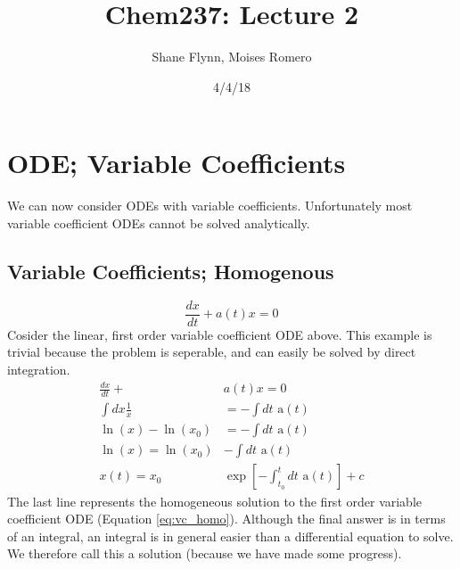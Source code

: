 \documentclass{article}
\title{Chem237: Lecture 2}
\date{4/4/18}
\author{Shane Flynn, Moises Romero}
\newcommand{\be}{\begin{equation}}
\newcommand{\ee}{\end{equation}}
\begin{document}
\maketitle
\section*{ODE; Variable Coefficients}
We can now consider ODEs with variable coefficients.
Unfortunately most variable coefficient ODEs cannot be solved analytically.

\subsection*{Variable Coefficients; Homogenous}
\be \label{eq:vc_homo}
\frac{dx}{dt} + a(t) x = 0
\ee
Cosider the linear, first order variable coefficient ODE above. 
This example is trivial because the problem is seperable, and can easily be solved by direct integration.
\be
\begin{split}
    \frac{dx}{dt} + &a(t) x = 0 \\
    \int dx \frac{1}{x} &= -\int dt \text{ a}(t) \\
    \ln(x) -\ln(x_0)  &= -\int dt \text{ a}(t) \\
    \ln(x)  = \ln(x_0) &-\int dt \text{ a}(t) \\
    x(t) = x_0 &\exp\left[-\int_{t_0}^t dt \text{ a}(t)\right] + c
\end{split}
\ee
The last line represents the homogeneous solution to the first order variable coefficient ODE (Equation \ref{eq:vc_homo}).
Although the final answer is in terms of an integral, an integral is in general easier than a differential equation to solve.
We therefore call this a solution (because we have made some progress).
\end{document}
